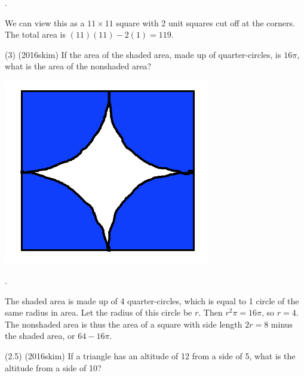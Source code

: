 \documentclass[11pt]{article}
\begin{document}
\begin{answer}
.
\end{answer}

\begin{solution}
We can view this as a $11\times11$ square with 2 unit squares cut off at the corners. The total area is $(11)(11)-2(1) = 119$.
\end{solution}


\begin{problem}
(3) (2016skim) If the area of the shaded area, made up of quarter-circles, is $16\pi$, what is the area of the nonshaded area?
\begin{center}
\includegraphics[width=9cm]{asteroid.png}
\end{center}
\end{problem}

\begin{answer}
.
\end{answer}

\begin{solution}
The shaded area is made up of 4 quarter-circles, which is equal to 1 circle of the same radius in area. Let the radius of this circle be $r$. Then $r^{2}\pi = 16\pi$, so $r = 4$. The nonshaded area is thus the area of a square with side length $2r = 8$ minus the shaded area, or $64 - 16\pi$.
\end{solution}


\begin{problem}
(2.5) (2016skim) If a triangle has an altitude of 12 from a side of 5, what is the altitude from a side of 10?
\end{problem}

\begin{answer}
\end{answer}
\end{document}
